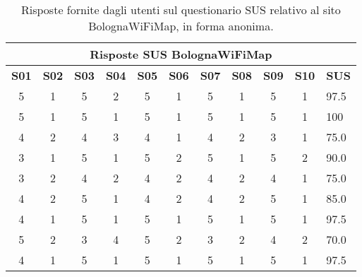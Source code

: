 \begin{center}
    \begin{table}[h]
        \centering
        \begin{tabularx}{\textwidth}{|c|c|c|c|c|c|c|c|c|c|X|}
            \hline
            \multicolumn{11}{|c|}{\textbf{Risposte SUS BolognaWiFiMap}} \\
            \hline
            \textbf{S01} & \textbf{S02} & \textbf{S03} & \textbf{S04} & \textbf{S05} & \textbf{S06} & \textbf{S07} & \textbf{S08} & \textbf{S09} & \textbf{S10} & \textbf{SUS} \\
            \hline
            5 & 1 & 5 & 2 & 5 & 1 & 5 & 1 & 5 & 1 & 97.5 \\
            5 & 1 & 5 & 1 & 5 & 1 & 5 & 1 & 5 & 1 & 100 \\
            4 & 2 & 4 & 3 & 4 & 1 & 4 & 2 & 3 & 1 & 75.0 \\
            3 & 1 & 5 & 1 & 5 & 2 & 5 & 1 & 5 & 2 & 90.0 \\
            3 & 2 & 4 & 2 & 4 & 2 & 4 & 2 & 4 & 1 & 75.0 \\
            4 & 2 & 5 & 1 & 4 & 2 & 4 & 2 & 5 & 1 & 85.0 \\
            4 & 1 & 5 & 1 & 5 & 1 & 5 & 1 & 5 & 1 & 97.5 \\
            5 & 2 & 3 & 4 & 5 & 2 & 3 & 2 & 4 & 2 & 70.0 \\
            4 & 1 & 5 & 1 & 5 & 1 & 5 & 1 & 5 & 1 & 97.5 \\
            \hline
        \end{tabularx}
        \caption[Risposte del questionario SUS sul sito BolognaWiFiMap]{Risposte fornite dagli utenti sul questionario SUS relativo al sito BolognaWiFiMap, in forma anonima.}
        \label{tab:sus_bolognawifimap}
    \end{table}
\end{center}


